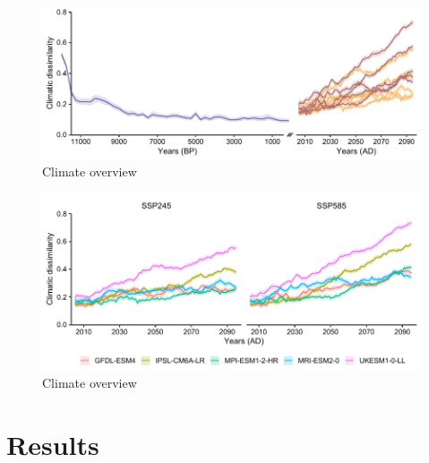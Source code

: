 \documentclass[11pt,]{article}
\begin{document}
\begin{figure}
\centering
\includegraphics{paper_files/figure-latex/figure_climatedissimilaritybis-1.pdf}
\caption{Climate overview}
\end{figure}

\begin{figure}
\centering
\includegraphics{paper_files/figure-latex/figure_climatedissimilarityGCM-1.pdf}
\caption{Climate overview}
\end{figure}

\hypertarget{results}{%
\section{Results}\label{results}}
\end{document}
